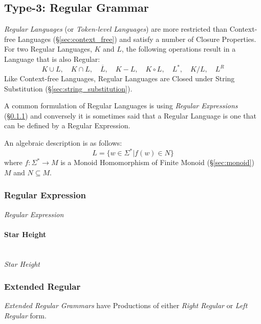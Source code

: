 \subsection{Type-3: Regular Grammar} \label{sec:regular_language}

\emph{Regular Languages} (or \emph{Token-level Languages}) are more
restricted than Context-free Languages (\S\ref{sec:context_free}) and
satisfy a number of Closure Properties. For two Regular Languages, $K$
and $L$, the following operations result in a Language that is also
Regular:
\[
  K \cup L, \quad
  K \cap L, \quad
  \overline{L}, \quad
  K - L, \quad
  K \circ L, \quad
  L^*, \quad
  K / L, \quad
  L^R
\]
Like Context-free Languages, Regular Languages are Closed under String
Substitution (\S\ref{sec:string_substitution}).

A common formulation of Regular Languages is using \emph{Regular
  Expressions} (\S\ref{sec:regular_expression}) and conversely it is
sometimes said that a Regular Language is one that can be defined by a
Regular Expression.

An algebraic description is as follows:
\[
  L = \{ w \in \Sigma^* | f(w) \in N \}
\]
where $f : \Sigma^* \rightarrow M$ is a Monoid Homomorphism of Finite
Monoid (\S\ref{sec:monoid}) $M$ and $N \subseteq M$.



\subsubsection{Regular Expression}\label{sec:regular_expression}

\emph{Regular Expression}



\paragraph{Star Height}\label{sec:star_height} \hfill \\

\emph{Star Height}



\subsubsection{Extended Regular}\label{sec:extended_regular}

\emph{Extended Regular Grammars} have Productions of either \emph{Right
Regular} or \emph{Left Regular} form.

